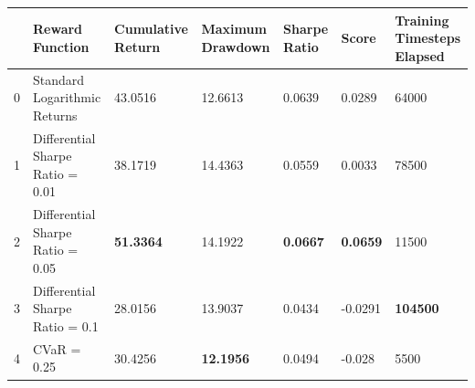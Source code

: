 \begin{tabular}{lllllll}
\toprule
 & Reward Function & Cumulative Return & Maximum Drawdown & Sharpe Ratio & Score & Training Timesteps Elapsed \\
\midrule
0 & Standard Logarithmic Returns & 43.0516 & 12.6613 & 0.0639 & 0.0289 & 64000 \\
1 & Differential Sharpe Ratio = 0.01 & 38.1719 & 14.4363 & 0.0559 & 0.0033 & 78500 \\
2 & Differential Sharpe Ratio = 0.05 & \textbf{51.3364} & 14.1922 & \textbf{0.0667} & \textbf{0.0659} & 11500 \\
3 & Differential Sharpe Ratio = 0.1 & 28.0156 & 13.9037 & 0.0434 & -0.0291 & \textbf{104500} \\
4 & CVaR = 0.25 & 30.4256 & \textbf{12.1956} & 0.0494 & -0.028 & 5500 \\
\bottomrule
\end{tabular}
